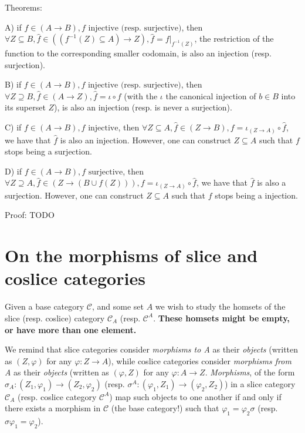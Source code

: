 \documentclass[12pt, letterpaper, twoside]{report}
\begin{document}
Theorems:

A) if $f \in (A \to B), f \text{ injective (resp. surjective)}$, then $\forall Z \subseteq B, \hat{f} \in ((f^{-1}(Z) \subseteq A) \to Z), \hat{f} = f|_{f^{-1}(Z)}$, the restriction of the function to the corresponding smaller codomain, is also an injection (resp. surjection).

B) if $f \in (A \to B), f \text{ injective (resp. surjective)}$, then $\forall Z \supseteq B, \hat{f} \in (A \to Z), \hat{f} = \iota \circ f$ (with the $\iota$ the canonical injection of $b \in B$ into its superset $Z$), is also an injection (resp. is never a surjection).

C) if $f \in (A \to B), f \text{ injective}$, then $\forall Z \subseteq A, \hat{f} \in (Z \to B), f = \iota_{(Z \to A)} \circ \hat{f}$, we have that $\hat{f}$ is also an injection. However, one can construct $Z \subseteq A$ such that $f$ stops being a surjection.

D) if $f \in (A \to B), f \text{ surjective}$, then $\forall Z \supseteq A, \hat{f} \in (Z \to (B \cup f(Z))), f = \iota_{(Z \to A)} \circ \hat{f}$, we have that $\hat{f}$ is also a surjection. However, one can construct $Z \subseteq A$ such that $f$ stops being a injection.

Proof: TODO





\section*{On the morphisms of slice and coslice categories}

Given a base category $\mathcal{C}$, and some set $A$ we wish to study the homsets of the slice (resp. coslice) category $\mathcal{C}_A$ (resp. $\mathcal{C}^A$. \textbf{These homsets might be empty, or have more than one element.}

We remind that slice categories consider \textit{morphisms to A} as their \textit{objects} (written as $(Z, \varphi)$ for any $\varphi : Z \to A$), while coslice categories consider \textit{morphisms from A} as their \textit{objects} (written as $(\varphi, Z)$ for any $\varphi : A \to Z$. \textit{Morphisms}, of the form $\sigma_A : (Z_1, \varphi_1) \to (Z_2, \varphi_2)$ (resp. $\sigma^A : (\varphi_1, Z_1) \to (\varphi_2, Z_2)$) in a slice category $\mathcal{C}_A$ (resp. coslice category $\mathcal{C}^A$) map such objects to one another if and only if there exists a morphism in $\mathcal{C}$ (the base category!) such that $\varphi_1 = \varphi_2 \sigma$ (resp. $\sigma \varphi_1 = \varphi_2$).
\end{document}
